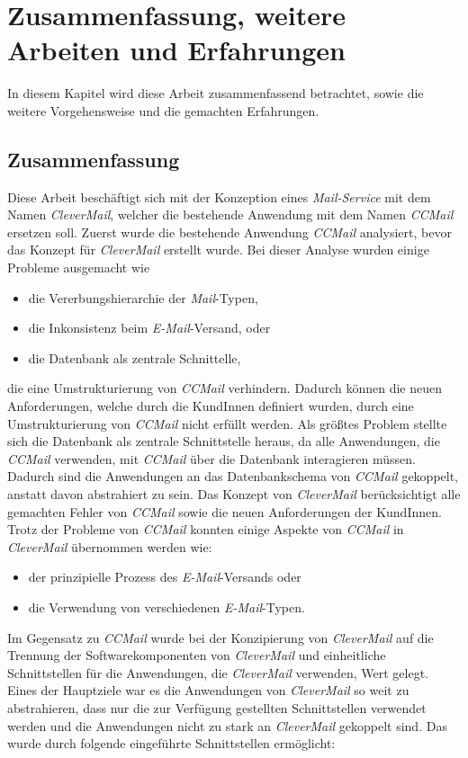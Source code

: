 \chapter{Zusammenfassung, weitere Arbeiten und Erfahrungen}
In diesem Kapitel wird diese Arbeit zusammenfassend betrachtet, sowie die weitere Vorgehensweise und die gemachten Erfahrungen.
\section{Zusammenfassung}
Diese Arbeit beschäftigt sich mit der Konzeption eines \emph{Mail-Service} mit dem Namen \emph{CleverMail}, welcher die bestehende Anwendung mit dem Namen \emph{CCMail} ersetzen soll. Zuerst wurde die bestehende Anwendung \emph{CCMail} analysiert, bevor das Konzept für \emph{CleverMail} erstellt wurde. Bei dieser Analyse wurden einige Probleme ausgemacht wie
\begin{itemize}
	\item die Vererbungshierarchie der \emph{Mail}-Typen,
	\item die Inkonsistenz beim \emph{E-Mail}-Versand, oder
	\item die Datenbank als zentrale Schnittelle,
\end{itemize}
die eine Umstrukturierung von \emph{CCMail} verhindern. Dadurch können die neuen Anforderungen, welche durch die KundInnen definiert wurden, durch eine Umstrukturierung von \emph{CCMail} nicht erfüllt werden. Als größtes Problem stellte sich die Datenbank als zentrale Schnittstelle heraus, da alle Anwendungen, die \emph{CCMail} verwenden, mit \emph{CCMail} über die Datenbank interagieren müssen. Dadurch sind die Anwendungen an das Datenbankschema von \emph{CCMail} gekoppelt, anstatt davon abstrahiert zu sein. 
\newline
\newline
Das Konzept von \emph{CleverMail} berücksichtigt alle gemachten Fehler von \emph{CCMail} sowie die neuen Anforderungen der KundInnen. Trotz der Probleme von \emph{CCMail} konnten einige Aspekte von \emph{CCMail} in \emph{CleverMail} übernommen werden wie:
\begin{itemize}
	\item der prinzipielle Prozess des \emph{E-Mail}-Versands oder
	\item die Verwendung von verschiedenen \emph{E-Mail}-Typen.
\end{itemize}
Im Gegensatz zu \emph{CCMail} wurde bei der Konzipierung von \emph{CleverMail} auf die Trennung der Softwarekomponenten von \emph{CleverMail} und einheitliche Schnittstellen für die Anwendungen, die \emph{CleverMail} verwenden, Wert gelegt. Eines der Hauptziele war es die Anwendungen von \emph{CleverMail} so weit zu abstrahieren, dass nur die zur Verfügung gestellten Schnittstellen verwendet werden und die Anwendungen nicht zu stark an \emph{CleverMail} gekoppelt sind. Das wurde durch folgende eingeführte Schnittstellen ermöglicht:
